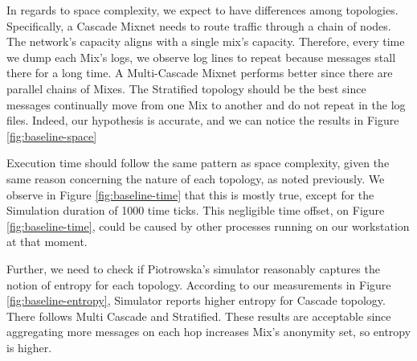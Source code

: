 \documentclass[logo,msc,cyber]{infthesis}   %
\begin{document}
In regards to space complexity, we expect to have differences among topologies.
Specifically, a Cascade Mixnet needs to route traffic through a chain of nodes.
The network's capacity aligns with a single mix's capacity. Therefore, every
time we dump each Mix's logs, we observe log lines to repeat because messages
stall there for a long time. A Multi-Cascade Mixnet performs better since there
are parallel chains of Mixes. The Stratified topology should be the best since
messages continually move from one Mix to another and do not repeat in the log
files. Indeed, our hypothesis is accurate, and we can notice the results in
Figure \ref{fig:baseline-space}

Execution time should follow the same pattern as space complexity, given the
same reason concerning the nature of each topology, as noted previously. We
observe in Figure \ref{fig:baseline-time} that this is mostly true, except for
the Simulation duration of 1000 time ticks. This negligible time offset, on
Figure \ref{fig:baseline-time}, could be caused by other processes running on
our workstation at that moment.

Further, we need to check if Piotrowska's simulator reasonably captures the
notion of entropy for each topology. According to our measurements in Figure
\ref{fig:baseline-entropy}, Simulator reports higher entropy for Cascade
topology. There follows Multi Cascade and Stratified. These results are
acceptable since aggregating more messages on each hop increases Mix's anonymity
set, so entropy is higher.
\end{document}
